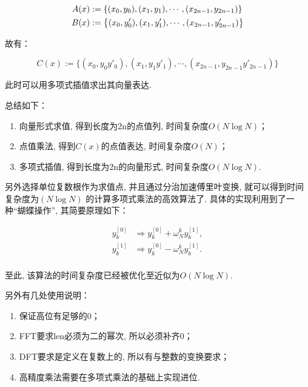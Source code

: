 \[ \begin{aligned}
A(x) &:= {\left\{ {(x_0, y_0), (x_1, y_1), \cdots , (x_{2n - 1}, y_{2n - 1})} \right\}} \\
B(x) &:= {\left\{ {(x_0, y'_0), (x_1, y'_1), \cdots , (x_{2n - 1}, y'_{2n - 1})} \right\}}
\end{aligned} \]

故有：

\begin{equation}
C(x) := \{(x_0, y_0y'_0), (x_1, y_1y'_1), \cdots , (x_{2n - 1}, y_{2n - 1}y'_{2n - 1})\}
\end{equation}

此时可以用多项式插值求出其向量表达.

总结如下：
\begin{enumerate}[parsep=0pt, itemsep=0pt, leftmargin=8em]
\item 向量形式求值, 得到长度为2n的点值列, 时间复杂度$O(N \log N)$；
\item 点值乘法, 得到$C(x)$的点值表达, 时间复杂度$O(N)$；
\item 多项式插值, 得到长度为2n的向量形式, 时间复杂度$O(N \log N)$.
\end{enumerate}

另外选择单位复数根作为求值点, 并且通过分治加速傅里叶变换, 就可以得到时间复杂度为$(N\log N)$
的计算多项式乘法的高效算法了. 具体的实现利用到了一种“蝴蝶操作”, 其简要原理如下：

\begin{equation}
\begin{aligned}
y_{k}^{[0]} &\Rightarrow y_{k}^{[0]} + \omega ^{k}_{N}y_{k}^{[1]},\\
y_{k}^{[1]} &\Rightarrow y_{k}^{[0]} - \omega ^{k}_{N}y_{k}^{[1]}.\\
\end{aligned}
\end{equation}

至此, 该算法的时间复杂度已经被优化至近似为$O(N \log N)$.

另外有几处使用说明：

\begin{enumerate}[parsep=0pt, itemsep=0pt, leftmargin=8em]
\item 保证高位有足够的0；
\item FFT要求len必须为二的幂次, 所以必须补齐0；
\item DFT要求是定义在复数上的, 所以有与整数的变换要求；
\item 高精度乘法需要在多项式乘法的基础上实现进位.
\end{enumerate}

